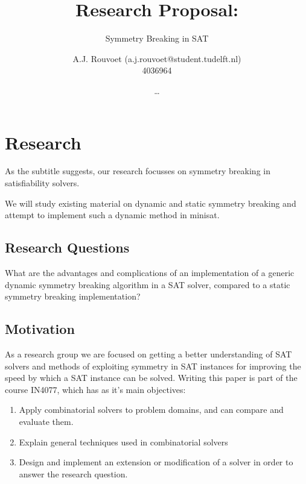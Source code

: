 

	\title{Research Proposal:}
	\author{
		A.J. Rouvoet (a.j.rouvoet@student.tudelft.nl) \\ 4036964 \and
		\ldots
	}

	\subtitle{Symmetry Breaking in SAT}



	\maketitle
	\newpage

	\section{Research}
		As the subtitle suggests, our research focusses on symmetry breaking in satisfiability
		solvers.

		We will study existing material on dynamic and static symmetry breaking and attempt to
		implement such a dynamic method in minisat.

		\subsection{Research Questions}
			What are the advantages and complications of an implementation of a generic dynamic
			symmetry breaking algorithm in a SAT solver, compared to a static symmetry breaking
			implementation?

		\subsection{Motivation}
			As a research group we are focused on getting a better understanding of SAT solvers and
			methods of exploiting symmetry in SAT instances for improving the speed by which a SAT
			instance can be solved.
			Writing this paper is part of the course IN4077, which has as it's main objectives:

			\begin{enumerate}
				\item
					Apply combinatorial solvers to problem domains, and can compare and evaluate
					them.
				\item
					Explain general techniques used in combinatorial solvers
				\item
					Design and implement an extension or modification of a solver in order to answer
					the research question.
			\end{enumerate}

